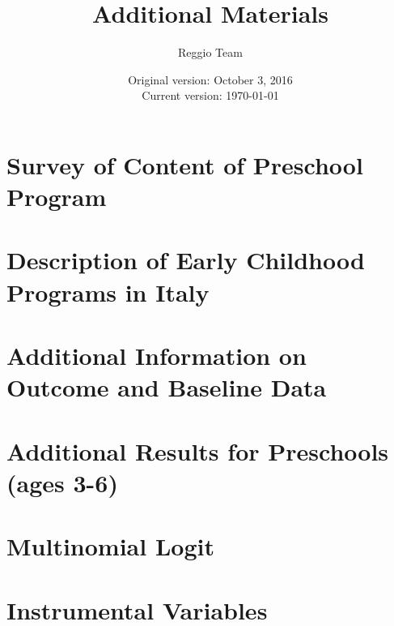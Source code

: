 

\setcounter{table}{0}
\renewcommand{\thetable}{A\arabic{table}}
\setcounter{figure}{0}
\renewcommand{\thefigure}{A\arabic{figure}}





\title{\Large \textbf{Additional Materials}}
\author{\normalsize Reggio Team}
\date{\normalsize Original version: October 3, 2016 \\ Current version: \today}
\maketitle

\tableofcontents

\doublespacing

\begin{appendices}

\section{Survey of Content of Preschool Program}\label{sec:survey}


\section{Description of Early Childhood Programs in Italy}\label{sec:programdes}


\section{Additional Information on Outcome and Baseline Data}\label{sec:data-app}


\section{Additional Results for Preschools (ages 3-6)}\label{sec:results}


\section{Multinomial Logit}\label{sec:multi-logit}

\clearpage

\section{Instrumental Variables}\label{sec:iv}

\clearpage


\end{appendices}





